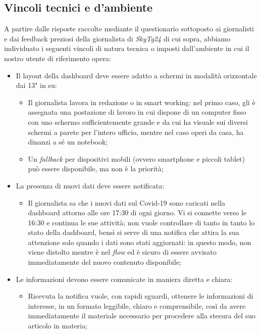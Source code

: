 \subsection{Vincoli tecnici e d'ambiente}
\label{ss:vincoli-tecnici-ambiente}
A partire dalle risposte raccolte mediante il questionario sottoposto ai giornalisti e dai feedback preziosi della giornalista di \emph{SkyTg24} di cui sopra, abbiamo individuato i seguenti vincoli di natura tecnica o imposti dall'ambiente in cui il nostro utente di riferimento opera:
\begin{itemize}
    \item Il layout della dashboard deve essere adatto a schermi in modalità orizzontale dai 13" in su:
    \begin{itemize}
        \item Il giornalista lavora in redazione o in smart working: nel primo caso, gli è assegnata una postazione di lavoro in cui dispone di un computer fisso con uno schermo sufficientemente grande e da cui ha visuale sui diversi schermi a parete per l'intero ufficio, mentre nel caso operi da casa, ha dinanzi a sé un notebook; 
        \item Un \textit{fallback} per dispositivi mobili (ovvero smartphone e piccoli tablet) può essere disponibile, ma non è la priorità;
    \end{itemize}
    \item La presenza di nuovi dati deve essere notificata:
    \begin{itemize}
        \item Il giornalista sa che i nuovi dati sul Covid-19 sono caricati nella dashboard attorno alle ore 17:30 di ogni giorno. Vi si connette verso le 16:30 e continua le sue attività; non vuole controllare di tanto in tanto lo stato della dashboard, bensì si serve di una notifica che attira la sua attenzione solo quando i dati sono stati aggiornati: in questo modo, non viene distolto mentre è nel \textit{flow} ed è sicuro di essere avvisato immediatamente del nuovo contenuto disponibile;
    \end{itemize}
	\item Le informazioni devono essere comunicate in maniera diretta e chiara:
	\begin{itemize}
        \item Ricevuta la notifica vuole, con rapidi sguardi, ottenere le informazioni di interesse, in un formato leggibile, chiaro e comprensibile, così da avere immediatamente il materiale necessario per procedere alla stesura del suo articolo in materia;

\end{itemize}
\end{itemize}
